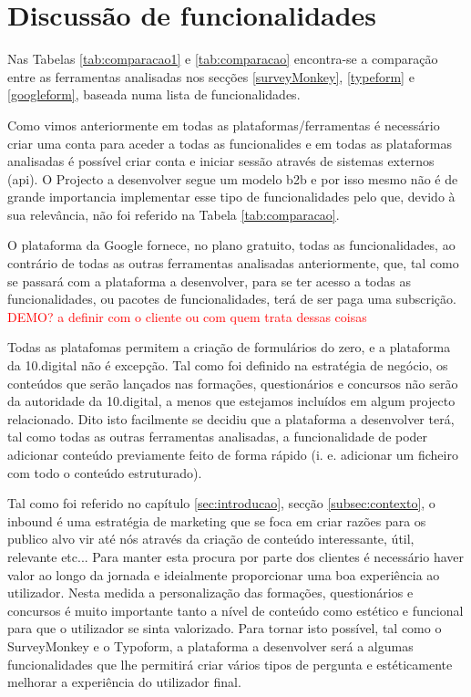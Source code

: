 \section{Discussão de funcionalidades}
\label{comparacao}

Nas Tabelas \ref{tab:comparacao1} e \ref{tab:comparacao} encontra-se a comparação entre as ferramentas analisadas nos secções \ref{surveyMonkey}, \ref{typeform} e \ref{googleform}, baseada numa lista de funcionalidades.

Como vimos anteriormente em todas as plataformas/ferramentas é necessário criar uma conta para aceder a todas as funcionalides e em todas as plataformas analisadas é possível criar conta e iniciar sessão através de sistemas externos (\acrshort{api}). O Projecto a desenvolver segue um modelo \gls{b2b} e por isso mesmo não é de grande importancia implementar esse tipo de funcionalidades pelo que, devido à sua relevância, não foi referido na Tabela \ref{tab:comparacao}.

O plataforma da Google fornece, no plano gratuito, todas as funcionalidades, ao contrário de todas as outras ferramentas analisadas anteriormente, que, tal como se passará com a plataforma a desenvolver, para se ter acesso a todas as funcionalidades, ou pacotes de funcionalidades, terá de ser paga uma subscrição. \textcolor{red}{DEMO? a definir com o cliente ou com quem trata dessas coisas}

Todas as platafomas permitem a criação de formulários do zero, e a plataforma da 10.digital não é excepção. Tal como foi definido na estratégia de negócio, os conteúdos que serão lançados nas formações, questionários e concursos não serão da autoridade da 10.digital, a menos que estejamos incluídos em algum projecto relacionado. Dito isto facilmente se decidiu que a plataforma a desenvolver terá, tal como todas as outras ferramentas analisadas, a funcionalidade de poder adicionar conteúdo previamente feito de forma rápido (i. e. adicionar um ficheiro com todo o conteúdo estruturado). 


Tal como foi referido no capítulo \ref{sec:introducao}, secção \ref{subsec:contexto}, o inbound é uma estratégia de marketing que se foca em criar razões para os publico alvo vir até nós através da criação de conteúdo interessante, útil, relevante etc... Para manter esta procura por parte dos clientes é necessário haver valor ao longo da jornada e ideialmente proporcionar uma boa experiência ao utilizador. Nesta medida a personalização das formações, questionários e concursos é muito importante tanto a nível de conteúdo como estético e funcional para que o utilizador se sinta valorizado. Para tornar isto possível, tal como o SurveyMonkey e o Typoform, a plataforma a desenvolver será a algumas funcionalidades que lhe permitirá criar vários tipos de pergunta e estéticamente melhorar a experiência do utilizador final.


